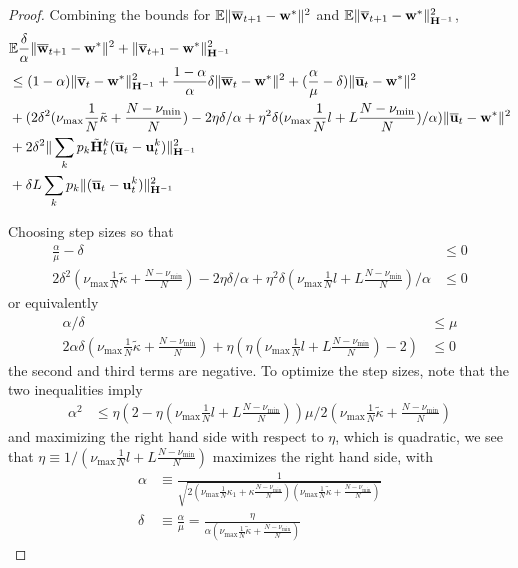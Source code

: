 \begin{proof}
	Combining the bounds for $\mathbb{E}\|{\overline{\mathbf{w}}}_{t+1}-{\mathbf{w}}^{\ast}\|^{2}$
	and $\mathbb{E}\|{\overline{\mathbf{v}}}_{t+1}-{\mathbf{w}}^{\ast}\|_{{\mathbf{H}}^{-1}}^{2}$, 
	\begin{align*}
	& \mathbb{E}\frac{\delta}{\alpha}\|{\overline{\mathbf{w}}}_{t+1}-{\mathbf{w}}^{\ast}\|^{2}+\|{\overline{\mathbf{v}}}_{t+1}-{\mathbf{w}}^{\ast}\|_{{\mathbf{H}}^{-1}}^{2}\\
	& \leq(1-\alpha)\|{\overline{\mathbf{v}}}_{t}-{\mathbf{w}}^{\ast}\|_{{\mathbf{H}}^{-1}}^{2}+\frac{1-\alpha}{\alpha}\delta\|{\overline{\mathbf{w}}}_{t}-{\mathbf{w}}^{\ast}\|^{2}+(\frac{\alpha}{\mu}-\delta)\|{\overline{\mathbf{u}}}_{t}-{\mathbf{w}}^{\ast}\|^{2}\\
	& +(2\delta^{2}(\nu_{\max}\frac{1}{N}\tilde{\kappa}+\frac{N-\nu_{\min}}{N})-2\eta\delta/\alpha+\eta^{2}\delta(\nu_{\max}\frac{1}{N}l+L\frac{N-\nu_{\min}}{N})/\alpha)\|{\overline{\mathbf{u}}}_{t}-{\mathbf{w}}^{\ast}\|^{2}\\
	& +2\delta^{2}\|\sum_{k}p_{k}\tilde{{\mathbf{H}}}_{t}^{k}({\overline{\mathbf{u}}}_{t}-{\mathbf{u}}_{t}^{k})\|_{{\mathbf{H}}^{-1}}^{2}\\
	& +\delta L\sum_{k}p_{k}\|({\overline{\mathbf{u}}}_{t}-{\mathbf{u}}_{t}^{k})\|_{{\mathbf{H}}^{-1}}^{2}
	\end{align*}
	
	Choosing step sizes so that 
	\begin{align*}
	\frac{\alpha}{\mu}-\delta & \leq0\\
	2\delta^{2}(\nu_{\max}\frac{1}{N}\tilde{\kappa}+\frac{N-\nu_{\min}}{N})-2\eta\delta/\alpha+\eta^{2}\delta(\nu_{\max}\frac{1}{N}l+L\frac{N-\nu_{\min}}{N})/\alpha & \leq0
	\end{align*}
	or equivalently 
	\begin{align*}
	\alpha/\delta & \leq\mu\\
	2\alpha\delta(\nu_{\max}\frac{1}{N}\tilde{\kappa}+\frac{N-\nu_{\min}}{N})+\eta(\eta(\nu_{\max}\frac{1}{N}l+L\frac{N-\nu_{\min}}{N})-2) & \leq0
	\end{align*}
	the second and third terms are negative. To optimize the step sizes,
	note that the two inequalities imply 
	\begin{align*}
	\alpha^{2} & \leq\eta(2-\eta(\nu_{\max}\frac{1}{N}l+L\frac{N-\nu_{\min}}{N}))\mu/2(\nu_{\max}\frac{1}{N}\tilde{\kappa}+\frac{N-\nu_{\min}}{N})
	\end{align*}
	and maximizing the right hand side with respect to $\eta$, which
	is quadratic, we see that $\eta\equiv1/(\nu_{\max}\frac{1}{N}l+L\frac{N-\nu_{\min}}{N})$
	maximizes the right hand side, with 
	\begin{align*}
	\alpha & \equiv\frac{1}{\sqrt{2(\nu_{\max}\frac{1}{N}\kappa_{1}+\kappa\frac{N-\nu_{\min}}{N})(\nu_{\max}\frac{1}{N}\tilde{\kappa}+\frac{N-\nu_{\min}}{N})}}\\
	\delta & \equiv\frac{\alpha}{\mu}=\frac{\eta}{\alpha(\nu_{\max}\frac{1}{N}\tilde{\kappa}+\frac{N-\nu_{\min}}{N})}
	\end{align*}
	

\end{proof}
